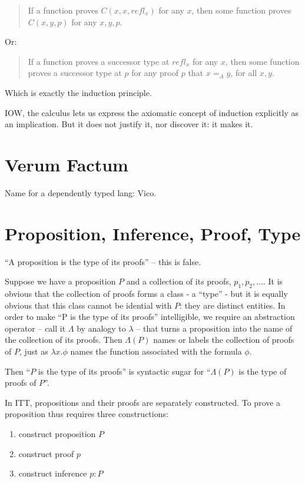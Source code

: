 \documentclass{article}
\begin{document}
\begin{quote}
  If a function proves \(C(x,x,refl_x)\) for any \(x\), then some
  function proves \(C(x,y,p)\) for any \(x,y,p\).
\end{quote}

\noindent Or:
\begin{quote}
  If a function proves a successor type at \(refl_x\) for any \(x\),
  then some function proves a successor type at \(p\) for any proof
  \(p\) that \(x=_Ay\), for all \(x,y\).
\end{quote}

Which is exactly the induction principle.

IOW, the calculus lets us express the axiomatic concept of induction
explicitly as an implication.  But it does not justify it, nor
discover it: it makes it.

\section{Verum Factum}

Name for a dependently typed lang:  Vico.

\section{Proposition, Inference, Proof, Type}

``A proposition is the type of its proofs'' -- this is false.

Suppose we have a proposition \(P\) and a collection of its proofs,
\(p_1, p_2,\ldots\).  It is obvious that the collection of proofs
forms a class - a ``type'' - but it is equally obvious that this class
cannot be idential with \(P\): they are distinct entities.  In order
to make ``P is the type of its proofs'' intelligible, we require an
abstraction operator -- call it \(\Lambda\) by analogy to \(\lambda\) --
that turns a proposition into the name of the collection of its
proofs.  Then \(\Lambda(P)\) names or labels the collection of proofs
of \(P\), just as \(\lambda x.\phi\) names the function associated
with the formula \(\phi\).

Then ``\(P\) is the type of its proofs'' is syntactic sugar for
``\(\Lambda(P)\) is the type of proofs of \(P\)''.

In ITT, propositions and their proofs are separately constructed.  To
prove a proposition thus requires three constructions:

\begin{enumerate}
\item construct proposition \(P\)
\item construct proof \(p\)
\item construct inference \(p{:}P\)
\end{enumerate}
\end{document}
